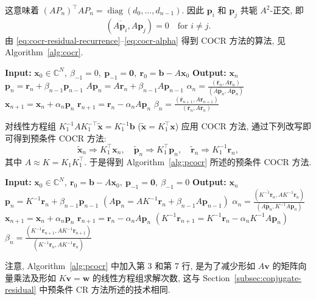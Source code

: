 {这意味着 $(AP_n)^{\top}AP_n=\operatorname{diag}(d_0,\ldots,d_{n-1})$. 因此 $\bm p_i$ 和 $\bm p_j$ 共轭 $A^2$-正交, 即}
\[(\overline{A\bm p_i},A\bm p_j)=0\quad\text{for }i\ne j.\]
{由 \eqref{eq:cocr-residual-recurrence}--\eqref{eq:cocr-alpha} 得到 COCR 方法的算法, 见 Algorithm\ \ref{alg:cocr}.}
\begin{algorithm}[H]\caption{{COCR 方法 (注意: $(\bar{\bm a},\bm b)=\bm a^{\top}\bm b$)}}\label{alg:cocr}\begin{algorithmic}[1]
\Statex\textbf{Input:} $\bm x_0\in\mathbb C^N,\ \beta_{-1}=0,\ \bm p_{-1}=\bm0,\ \bm r_0=\bm b-A\bm x_0$
\Statex\textbf{Output:} $\bm x_n$
\State $\bm p_n=\bm r_n+\beta_{n-1}\bm p_{n-1}$
\State $A\bm p_n=A\bm r_n+\beta_{n-1}A\bm p_{n-1}$
\State $\alpha_n=\frac{(\bar{\bm r}_n,A\bm r_n)}{(\overline{A\bm p_n},A\bm p_n)}$
\State $\bm x_{n+1}=\bm x_n+\alpha_n\bm p_n$
\State $\bm r_{n+1}=\bm r_n-\alpha_nA\bm p_n$
\State $\beta_n=\frac{(\bar{\bm r}_{n+1},A\bm r_{n+1})}{(\bar{\bm r}_n,A\bm r_n)}$
\EndFor\end{algorithmic}\end{algorithm}
{对线性方程组 $K_1^{-1}AK_1^{-\top}\widetilde{\bm x}=K_1^{-1}\bm b$ ($\widetilde{\bm x}=K_1^{\top}\bm x$) 应用 COCR 方法, 通过下列改写即可得到预条件 COCR 方法:}
\[\widetilde{\bm x}_n\Rightarrow K_1^{\top}\bm x_n,\quad\widetilde{\bm p}_n\Rightarrow K_1^{\top}\bm p_n,\quad\widetilde{\bm r}_n\Rightarrow K_1^{-1}\bm r_n,\]
{其中 $A\approx K=K_1K_1^{\top}$. 于是得到 Algorithm\ \ref{alg:pcocr} 所述的预条件 COCR 方法.}
\begin{algorithm}[H]\caption{{预条件 COCR 方法 (注意: $(\bar{\bm a},\bm b)=\bm a^{\top}\bm b$)}}\label{alg:pcocr}\begin{algorithmic}[1]
\Statex\textbf{Input:} $\bm x_0\in\mathbb C^N,\ \bm r_0=\bm b-A\bm x_0,\ \bm p_{-1}=\bm0,\ \beta_{-1}=0$
\Statex\textbf{Output:} $\bm x_n$
\State $\bm p_n=K^{-1}\bm r_n+\beta_{n-1}\bm p_{n-1}$
\State $(A\bm p_n=AK^{-1}\bm r_n+\beta_{n-1}A\bm p_{n-1})$
\State $\alpha_n=\frac{(\overline{K^{-1}\bm r_n},AK^{-1}\bm r_n)}{(\overline{A\bm p_n},K^{-1}A\bm p_n)}$
\State $\bm x_{n+1}=\bm x_n+\alpha_n\bm p_n$
\State $\bm r_{n+1}=\bm r_n-\alpha_nA\bm p_n$
\State $(K^{-1}\bm r_{n+1}=K^{-1}\bm r_n-\alpha_nK^{-1}A\bm p_n)$
\State $\beta_n=\frac{(\overline{K^{-1}\bm r_{n+1}},AK^{-1}\bm r_{n+1})}{(\overline{K^{-1}\bm r_n},AK^{-1}\bm r_n)}$
\EndFor\end{algorithmic}\end{algorithm}
{注意, Algorithm\ \ref{alg:pcocr} 中加入第 3 和第 7 行, 是为了减少形如 $A\bm v$ 的矩阵向量乘法及形如 $K\bm v=\bm w$ 的线性方程组求解次数, 这与 Section\ \ref{subsec:conjugate-residual} 中预条件 CR 方法所述的技术相同.}
